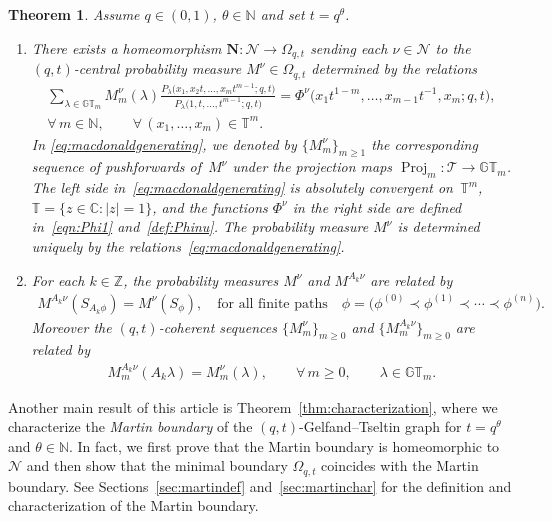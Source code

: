 \documentclass[pdftex]{sigma}
\numberwithin{equation}{section}
\newtheorem{thm}{Theorem}[section]
\newcommand{\C}{\mathbb{C}}
\newcommand{\Z}{\mathbb{Z}}
\newcommand{\N}{\mathbb{N}}
\newcommand{\Nu}{\mathcal{N}}
\newcommand{\GT}{\mathbb{GT}}
\newcommand{\TT}{\mathbb{T}}
\newcommand{\Tau}{\mathcal{T}}
\newcommand{\NN}{\mathbf{N}}
\begin{document}
\begin{thm}\label{thm:mainapplication}
Assume $q\in (0, 1)$, $\theta\in\N$ and set $t = q^{\theta}$.
\begin{enumerate}\itemsep=0pt
	\item[$1.$] There exists a homeomorphism $\NN\colon \Nu \rightarrow \Omega_{q, t}$ sending each $\nu\in\Nu$ to the $(q, t)$-central probability measure $M^{\nu} \in \Omega_{q, t}$ determined by the relations
\begin{gather}
\sum_{\lambda\in\GT_m}{M_m^{\nu}(\lambda)\frac{P_{\lambda}\big(x_1, x_2t, \dots, x_mt^{m-1}; q, t\big)}{P_{\lambda}\big(1, t, \dots, t^{m-1}; q, t\big)}} = \Phi^{\nu}\big(x_1 t^{1-m}, \dots, x_{m-1}t^{-1}, x_m; q, t\big),\nonumber \\
\forall\, m\in\N, \qquad \forall\, (x_1, \dots, x_m)\in\TT^m.\label{eq:macdonaldgenerating}
\end{gather}
In \eqref{eq:macdonaldgenerating}, we denoted by $\{M^{\nu}_m\}_{m\geq 1}$ the corresponding sequence of pushforwards of~$M^{\nu}$ under the projection maps $\operatorname{Proj}_m\colon \Tau\rightarrow\GT_m$.
The left side in~\eqref{eq:macdonaldgenerating} is absolutely convergent on~$\TT^m$, $\mathbb{T} = \{z\in\C \colon |z| = 1\}$, and the functions $\Phi^{\nu}$ in the right side are defined in~\eqref{eqn:Phi1} and~\eqref{def:Phinu}. The probability measure $M^{\nu}$ is determined uniquely by the relations~\eqref{eq:macdonaldgenerating}.

	\item[$2.$] For each $k\in\Z$, the probability measures $M^{\nu}$ and $M^{A_k\nu}$ are related by
\begin{gather}
M^{A_k\nu}(S_{A_k\phi}) = M^{\nu}(S_{\phi}), \quad \textrm{for all finite paths} \quad \phi = \big(\phi^{(0)} \prec \phi^{(1)} \prec \cdots \prec \phi^{(n)}\big).
\end{gather}
Moreover the $(q, t)$-coherent sequences $\{M^{\nu}_m\}_{m \geq 0}$ and $\{M^{A_k\nu}_m\}_{m \geq 0}$ are related by
\begin{gather}\label{eq:shifts2}
M_m^{A_k \nu}(A_k \lambda) = M^{\nu}_m(\lambda), \qquad \forall \, m \geq 0, \qquad \lambda\in\GT_m.
\end{gather}
\end{enumerate}
\end{thm}

Another main result of this article is Theorem~\ref{thm:characterization}, where we characterize the \textit{Martin boundary} of the $(q, t)$-Gelfand--Tseltin graph for $t = q^{\theta}$ and $\theta\in\N$. In fact, we f\/irst prove that the Martin boundary is homeomorphic to $\Nu$ and then show that the minimal boundary $\Omega_{q, t}$ coincides with the Martin boundary.
See Sections~\ref{sec:martindef} and~\ref{sec:martinchar} for the def\/inition and characterization of the Martin boundary.
\end{document}
